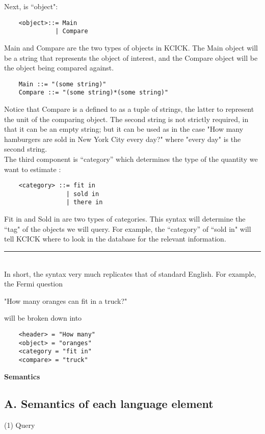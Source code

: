 \documentclass{article}
\begin{document}
Next, is ``object":
\begin{verbatim}
    <object>::= Main
              | Compare
\end{verbatim}
Main and Compare are the two types of objects in KCICK. The Main object will be a string that represents the object of interest, and the Compare object will be the object being compared against. 
\begin{verbatim}
    Main ::= "(some string)"
    Compare ::= "(some string)*(some string)"
\end{verbatim}
Notice that Compare is a defined to as a tuple of strings, the latter to represent the unit of the comparing object. The second string is not strictly required, in that it can be an empty string; but it can be used as in the case "How many hamburgers are sold in New York City every day?" where "every day" is the second string. \\

The third component is ``category'' which determines the type of the quantity we want to estimate :
\begin{verbatim}
    <category> ::= fit in
                 | sold in
                 | there in
\end{verbatim}
Fit in and Sold in are two types of categories. This syntax will determine the ``tag" of the objects we will query. For example, the ``category'' of ``sold in" will tell KCICK where to look in the database for the relevant information.\\

\noindent\rule{6.5in}{0.6pt}\\ [2mm]

In short, the syntax very much replicates that of standard English. For example, the Fermi question
\begin{center}
"How many oranges can fit in a truck?"
\end{center}
will be broken down into 
\begin{verbatim}
    <header> = "How many" 
    <object> = "oranges"
    <category = "fit in"
    <compare> = "truck"
\end{verbatim}

\newpage
{\large{\textbf{Semantics}}} 
\subsection{A. Semantics of each language element}

(1) Query 
\vspace{5pt}
\end{document}
